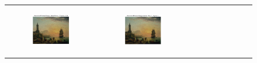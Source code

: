 \documentclass[hidelinks,12pt]{article}
\begin{document}
\begin{figure}[!h]
{\begin{tabular}{cccc}
				\begin{subfigure}[h]{0.25\textwidth}
					\centering
					\includegraphics[width=\textwidth]{figures/gaussian_filter/5.png}
				\end{subfigure} &
				\begin{subfigure}[h]{0.25\textwidth}
					\centering
					\includegraphics[width=\textwidth]{figures/gaussian_filter/6.png}
				\end{subfigure} &
				\begin{subfigure}[h]{0.25\textwidth}
					\centering

\end{subfigure}
\end{tabular}}
\end{figure}
\end{document}
